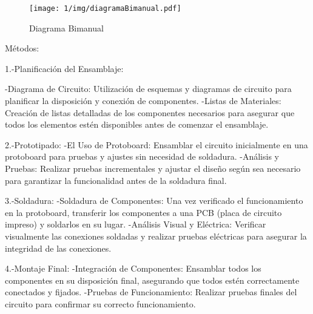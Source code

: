     \begin{figure}[H]
        \centering
        \texttt{[image: 1/img/diagramaBimanual.pdf]}
        \caption{Diagrama Bimanual}
        \label{fig:diagramaBimanual}
    \end{figure}
    
    
    
    Métodos:
    
    1.-Planificación del Ensamblaje:
    
    -Diagrama de Circuito: Utilización de esquemas y diagramas de circuito para planificar la disposición y conexión de componentes.
    -Listas de Materiales: Creación de listas detalladas de los componentes necesarios para asegurar que todos los elementos estén disponibles antes de comenzar el ensamblaje.
    
    2.-Prototipado:
    -El Uso de Protoboard: Ensamblar el circuito inicialmente en una protoboard para pruebas y ajustes sin necesidad de soldadura.
    -Análisis y Pruebas: Realizar pruebas incrementales y ajustar el diseño según sea necesario para garantizar la funcionalidad antes de la soldadura final.
    
    3.-Soldadura:
    -Soldadura de Componentes: Una vez verificado el funcionamiento en la protoboard, transferir los componentes a una PCB (placa de circuito impreso) y soldarlos en su lugar.
    -Análisis Visual y Eléctrica: Verificar visualmente las conexiones soldadas y realizar pruebas eléctricas para asegurar la integridad de las conexiones.
    
    4.-Montaje Final:
    -Integración de Componentes: Ensamblar todos los componentes en su disposición final, asegurando que todos estén correctamente conectados y fijados.
    -Pruebas de Funcionamiento: Realizar pruebas finales del circuito  para confirmar su correcto funcionamiento.
    
